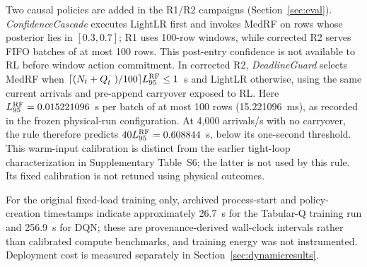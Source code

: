 Two causal policies are added in the R1/R2 campaigns (Section~\ref{sec:eval}). \emph{ConfidenceCascade} executes LightLR first and invokes MedRF on rows whose posterior lies in $[0.3,0.7]$; R1 uses 100-row windows, while corrected R2 serves FIFO batches of at most 100 rows. This post-entry confidence is not available to RL before window action commitment. In corrected R2, \emph{DeadlineGuard} selects MedRF when $\lceil(N_t+Q_t^-)/100\rceil L_{95}^{\rm RF}\leq1$~s and LightLR otherwise, using the same current arrivals and pre-append carryover exposed to RL. Here $L_{95}^{\rm RF}=0.015221096$~s per batch of at most 100 rows (15.221096~ms), as recorded in the frozen physical-run configuration. At 4,000 arrivals/s with no carryover, the rule therefore predicts $40L_{95}^{\rm RF}=0.608844$~s, below its one-second threshold. This warm-input calibration is distinct from the earlier tight-loop characterization in Supplementary Table~S6; the latter is not used by this rule. Its fixed calibration is not retuned using physical outcomes.

For the original fixed-load training only, archived process-start and policy-creation timestamps indicate approximately 26.7~s for the Tabular-Q training run and 256.9~s for DQN; these are provenance-derived wall-clock intervals rather than calibrated compute benchmarks, and training energy was not instrumented. Deployment cost is measured separately in Section~\ref{sec:dynamicresults}.
